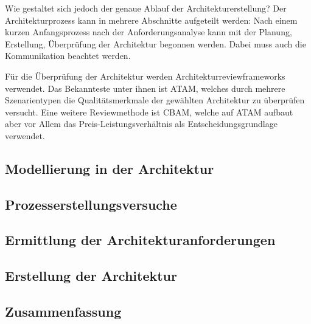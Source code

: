 Wie gestaltet sich jedoch der genaue Ablauf der Architekturerstellung? Der Architekturprozess kann in mehrere Abschnitte aufgeteilt werden: Nach einem kurzen Anfangsprozess nach der Anforderungsanalyse kann mit der Planung, Erstellung, Überprüfung der Architektur begonnen werden. Dabei muss auch die Kommunikation beachtet werden.

Für die Überprüfung der Architektur werden Architekturreviewframeworks verwendet. Das Bekannteste unter ihnen ist ATAM, welches durch mehrere Szenarientypen die Qualitätsmerkmale der gewählten Architektur zu überprüfen versucht. Eine weitere Reviewmethode ist CBAM, welche auf ATAM aufbaut aber vor Allem das Preis-Leistungsverhältnis als Entscheidungsgrundlage verwendet.

\subsection{Modellierung in der Architektur}
\subsection{Prozesserstellungsversuche}
\subsection{Ermittlung der Architekturanforderungen}
\subsection{Erstellung der Architektur}
\subsection{Zusammenfassung}